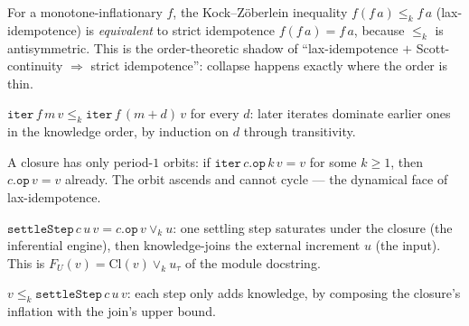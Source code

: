 \begin{theorem}\label{thm:kz-iff-strict}\leanok{}
For a monotone-inflationary $f$, the Kock--Z\"oberlein inequality
$f(f\,a) \le_k f\,a$ (lax-idempotence) is \emph{equivalent} to strict
idempotence $f(f\,a) = f\,a$, because $\le_k$ is antisymmetric. This is the
order-theoretic shadow of ``lax-idempotence $+$ Scott-continuity $\Rightarrow$
strict idempotence'': collapse happens exactly where the order is thin.
\end{theorem}

\begin{theorem}\label{thm:iter-le-add}\leanok{}
$\texttt{iter}\,f\,m\,v \le_k \texttt{iter}\,f\,(m+d)\,v$ for every $d$: later
iterates dominate earlier ones in the knowledge order, by induction on $d$
through transitivity.
\end{theorem}

\begin{theorem}\label{thm:no-periodic-orbits}\leanok{}
A closure has only period-$1$ orbits: if $\texttt{iter}\,c.\texttt{op}\,k\,v = v$
for some $k \ge 1$, then $c.\texttt{op}\,v = v$ already. The orbit ascends and
cannot cycle --- the dynamical face of lax-idempotence.
\end{theorem}

\begin{definition}[The settling-endofunctor $F_U = \mathrm{Cl} \vee_k u$]\label{def:settle-step}\leanok{}
$\texttt{settleStep}\,c\,u\,v = c.\texttt{op}\,v \vee_k u$: one settling step
saturates under the closure (the inferential engine), then knowledge-joins the
external increment $u$ (the input). This is $F_U(v) = \mathrm{Cl}(v) \vee_k
u_\tau$ of the module docstring.
\end{definition}

\begin{theorem}\label{thm:settle-step-infl}\leanok{}
$v \le_k \texttt{settleStep}\,c\,u\,v$: each step only adds knowledge, by
composing the closure's inflation with the join's upper bound.
\end{theorem}

